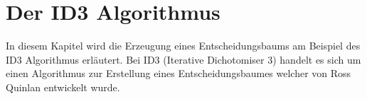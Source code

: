 \chapter{Der ID3 Algorithmus}
\label{id3}
In diesem Kapitel wird die Erzeugung eines Entscheidungsbaums am Beispiel des ID3 Algorithmus erläutert. Bei ID3 (Iterative Dichotomiser 3) handelt es sich um einen Algorithmus zur Erstellung eines Entscheidungsbaumes welcher von Ross Quinlan entwickelt wurde. \Autocite{QuinlanID3}




